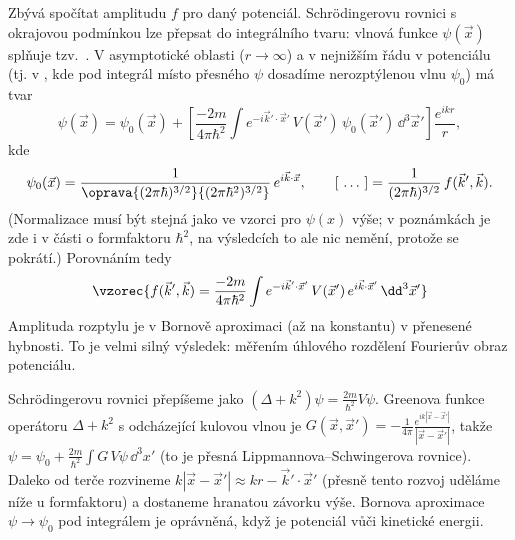 Zbývá spočítat amplitudu $f$ pro daný potenciál. Schrödingerovu rovnici s okrajovou podmínkou  lze přepsat do integrálního tvaru: vlnová funkce $\psi(\vec x)$ splňuje tzv.\ . V asymptotické oblasti ($r\to\infty$) a v nejnižším řádu v potenciálu (tj. v , kde pod integrál místo přesného $\psi$ dosadíme nerozptýlenou vlnu $\psi_0$) má tvar
\begin{equation}
  \psi(\vec x) = \psi_0(\vec x) + \left[\frac{-2m}{4\pi\hbar^2}\int e^{-i\vec k'\cdot\vec x'}\,V(\vec x')\,\psi_0(\vec x')\,\dd^3\vec x'\right]\frac{e^{ikr}}{r},
\end{equation}
kde
\[
  \psi_0(\vec x) = \frac{1}{\oprava{(2\pi\hbar)^{3/2}}{(2\pi\hbar^2)^{3/2}}}\,e^{i\vec k\cdot\vec x},
  \qquad
  [\ \ldots\ ] = \frac{1}{(2\pi\hbar)^{3/2}}\,f(\vec k',\vec k) .
\]
(Normalizace musí být stejná jako ve vzorci pro $\psi(x)$ výše; v poznámkách je zde i v části o formfaktoru $\hbar^2$, na výsledcích to ale nic nemění, protože se pokrátí.) Porovnáním tedy
\begin{equation}
  \vzorec{f(\vec k',\vec k) = \frac{-2m}{4\pi\hbar^2}\int e^{-i\vec k'\cdot\vec x'}\,V(\vec x')\,e^{i\vec k\cdot\vec x'}\,\dd^3\vec x'}
\end{equation}
Amplituda rozptylu je v Bornově aproximaci (až na konstantu)  v přenesené hybnosti. To je velmi silný výsledek: měřením úhlového rozdělení  Fourierův obraz potenciálu.

\begin{vysvetleni}
Schrödingerovu rovnici přepíšeme jako $(\Delta + k^2)\psi = \frac{2m}{\hbar^2}V\psi$. Greenova funkce operátoru $\Delta+k^2$ s odcházející kulovou vlnou je $G(\vec x,\vec x') = -\frac{1}{4\pi}\frac{e^{ik|\vec x-\vec x'|}}{|\vec x-\vec x'|}$, takže $\psi = \psi_0 + \frac{2m}{\hbar^2}\int G\,V\psi\,\dd^3x'$ (to je přesná Lippmannova--Schwingerova rovnice). Daleko od terče rozvineme $k|\vec x-\vec x'| \approx kr - \vec k'\cdot\vec x'$ (přesně tento rozvoj uděláme níže u formfaktoru) a dostaneme hranatou závorku výše. Bornova aproximace $\psi\to\psi_0$ pod integrálem je oprávněná, když je potenciál  vůči kinetické energii.
\end{vysvetleni}


